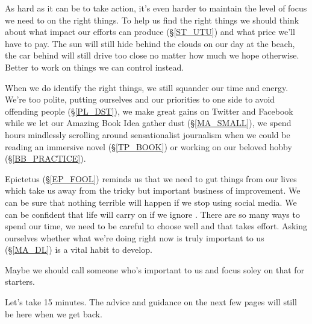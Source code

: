 \cleardoublepage
{\small

As hard as it can be to take action, it's even harder to maintain the level of focus we need to on the right things. To help us find the right things we should think about what impact our efforts can produce (\S \ref{ST_UTU}) and what price we'll have to pay. The sun will still hide behind the clouds on our day at the beach, the car behind will still drive too close no matter how much we hope otherwise. Better to work on things we can control instead.  %

When we do identify the right things, we still squander our time and energy. We're too polite, putting ourselves and our priorities to one side to avoid offending people (\S \ref{PL_DST}), we make great gains on Twitter and Facebook while we let our Amazing Book Idea gather dust (\S \ref{MA_SMALL}), we spend hours mindlessly scrolling around sensationalist journalism when we could be reading an immersive novel (\S \ref{TP_BOOK}) or working on our beloved hobby (\S \ref{BB_PRACTICE}). 

Epictetus (\S \ref{EP_FOOL}) reminds us that we need to gut things from our lives which take us away from the tricky but important business of improvement. We can be sure that nothing terrible will happen if we stop using social media. We can be confident that life will carry on if we ignore . There are so many ways to spend our time, we need to be careful to choose well and that takes effort. Asking ourselves whether what we're doing right now is truly important to us (\S \ref{MA_DL}) is a vital habit to develop.

Maybe we should call someone who's important to us and focus soley on that for starters. 

Let's take 15 minutes. The advice and guidance on the next few pages will still be here when we get back. 

}
